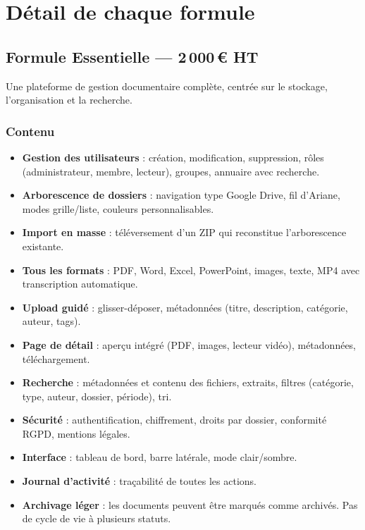\documentclass[a4paper,12pt,french]{article}
\begin{document}
\newpage
\section{Détail de chaque formule}

\subsection{Formule Essentielle — 2\,000\,€ HT}

Une plateforme de gestion documentaire complète, centrée sur le stockage, l'organisation et la recherche.

\subsubsection{Contenu}

\begin{itemize}[leftmargin=1.5em]
  \item \textbf{Gestion des utilisateurs} : création, modification, suppression, rôles (administrateur, membre, lecteur), groupes, annuaire avec recherche.
  \item \textbf{Arborescence de dossiers} : navigation type Google Drive, fil d'Ariane, modes grille/liste, couleurs personnalisables.
  \item \textbf{Import en masse} : téléversement d'un ZIP qui reconstitue l'arborescence existante.
  \item \textbf{Tous les formats} : PDF, Word, Excel, PowerPoint, images, texte, MP4 avec transcription automatique.
  \item \textbf{Upload guidé} : glisser-déposer, métadonnées (titre, description, catégorie, auteur, tags).
  \item \textbf{Page de détail} : aperçu intégré (PDF, images, lecteur vidéo), métadonnées, téléchargement.
  \item \textbf{Recherche} : métadonnées et contenu des fichiers, extraits, filtres (catégorie, type, auteur, dossier, période), tri.
  \item \textbf{Sécurité} : authentification, chiffrement, droits par dossier, conformité RGPD, mentions légales.
  \item \textbf{Interface} : tableau de bord, barre latérale, mode clair/sombre.
  \item \textbf{Journal d'activité} : traçabilité de toutes les actions.
  \item \textbf{Archivage léger} : les documents peuvent être marqués comme archivés. Pas de cycle de vie à plusieurs statuts.
\end{itemize}
\end{document}
